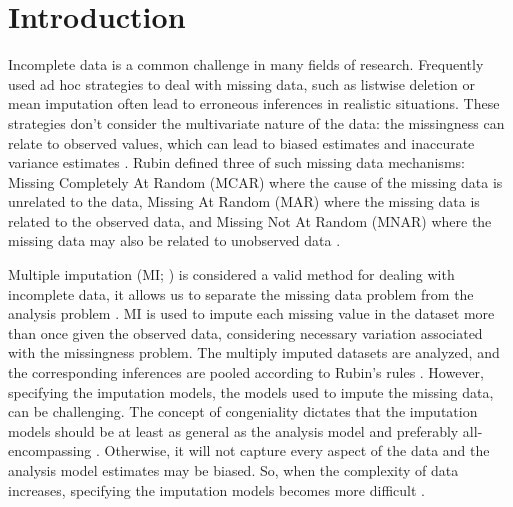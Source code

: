 \documentclass[10pt, a4paper, titlepage]{article}
\begin{document}
\newpage

\section{Introduction}

Incomplete data is a common challenge in many fields of research. Frequently used ad hoc strategies to deal with missing data, such as listwise deletion or mean imputation often lead to erroneous inferences in realistic situations. These strategies don't consider the multivariate nature of the data: the missingness can relate to observed values, which can lead to biased estimates and inaccurate variance estimates \citep{buurenFlexibleImputationMissing2018, kang2013, enders2017, austin2021}. Rubin defined three of such missing data mechanisms: Missing Completely At Random (MCAR) where the cause of the missing data is unrelated to the data, Missing At Random (MAR) where the missing data is related to the observed data, and Missing Not At Random (MNAR) where the missing data may also be related to unobserved data \citep{rubin1976}.

Multiple imputation (MI; \citealt{rubin1987}) is considered a valid method for dealing with incomplete data, it allows us to separate the missing data problem from the analysis problem \citep{mistlerComparisonJointModel2017, buurenFlexibleImputationMissing2018, enders2017, burgette2010, austin2021, audigier2018, vanbuuren2007, grund2021, hughes2014}. MI is used to impute each missing value in the dataset more than once given the observed data, considering necessary variation associated with the missingness problem. The multiply imputed datasets are analyzed, and the corresponding inferences are pooled according to Rubin's rules \citep{buurenFlexibleImputationMissing2018, austin2021, rubin1987, carpenter2013}. However, specifying the imputation models, the models used to impute the missing data, can be challenging. The concept of congeniality dictates that the imputation models should be at least as general as the analysis model and preferably all-encompassing \citep{grund2018, enders2018, meng1994multiple, bartlett2015, grund2016}. Otherwise, it will not capture every aspect of the data and the analysis model estimates may be biased. So, when the complexity of data increases, specifying the imputation models becomes more difficult \citep{grund2018, buurenFlexibleImputationMissing2018}.
\end{document}
